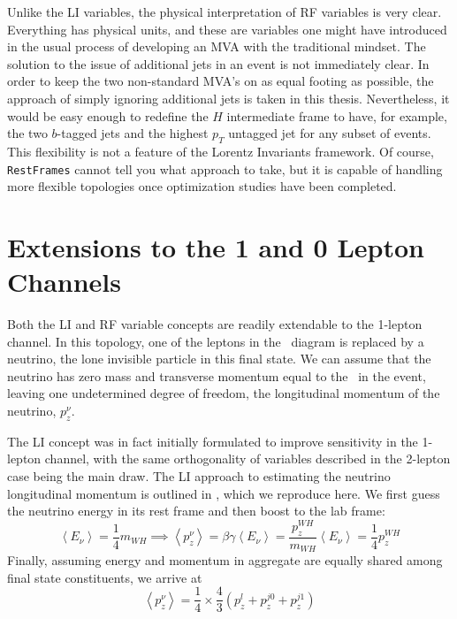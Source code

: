Unlike the LI variables, the physical interpretation of RF variables is very clear.  Everything has physical units, and these are variables one might have introduced in the usual process of developing an MVA with the traditional mindset.  The solution to the issue of additional jets in an event is not immediately clear.  In order to keep the two non-standard MVA's on as equal footing as possible, the approach of simply ignoring additional jets is taken in this thesis.  Nevertheless, it would be easy enough to redefine the $H$ intermediate frame to have, for example, the two $b$-tagged jets and the highest $p_T$ untagged jet for any subset of events.  This flexibility is not a feature of the Lorentz Invariants framework.  Of course, \texttt{RestFrames} cannot tell you what approach to take, but it is capable of handling more flexible topologies once optimization studies have been completed.

\section{Extensions to the 1 and 0 Lepton Channels}
\label{sec:rfli01lep}
Both the LI and RF variable concepts are readily extendable to the 1-lepton channel.  In this topology, one of the leptons in the \ZH\, diagram is replaced by a neutrino, the lone invisible particle in this final state.  We can assume that the neutrino has zero mass and transverse momentum equal to the \met\, in the event, leaving one undetermined degree of freedom, the longitudinal momentum of the neutrino, $p_z^{\nu}$.  

The LI concept was in fact initially formulated to improve sensitivity in the 1-lepton channel, with the same orthogonality of variables described in the 2-lepton case being the main draw.  The LI approach to estimating the neutrino longitudinal momentum is outlined in \cite{litalk}, which we reproduce here.  We first guess the neutrino energy in its rest frame and then boost to the lab frame:
\begin{equation}
\left<E_\nu\right>=\frac{1}{4}m_{WH}\implies \left<p_z^{\nu}\right>=\beta\gamma\left<E_\nu\right>=\frac{p_z^{WH}}{m_{WH}}\left<E_\nu\right>=\frac{1}{4}p_z^{WH}
\end{equation}
Finally, assuming energy and momentum in aggregate are equally shared among final state constituents, we arrive at
\begin{equation}
\label{eqn:lipz}
\left<p_z^{\nu}\right>=\frac{1}{4}\times \frac{4}{3}\left(p_z^l+p_z^{j0}+p_z^{j1}\right)
\end{equation}

